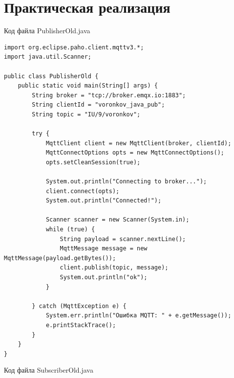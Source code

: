 \documentclass[a4paper, 14pt]{extarticle}
\begin{document}
\section{Практическая реализация}
Код файла PublisherOld.java
\begin{lstlisting}
import org.eclipse.paho.client.mqttv3.*;
import java.util.Scanner;

public class PublisherOld {
    public static void main(String[] args) {
        String broker = "tcp://broker.emqx.io:1883";
        String clientId = "voronkov_java_pub";
        String topic = "IU/9/voronkov";

        try {
            MqttClient client = new MqttClient(broker, clientId);
            MqttConnectOptions opts = new MqttConnectOptions();
            opts.setCleanSession(true);

            System.out.println("Connecting to broker...");
            client.connect(opts);
            System.out.println("Connected!");

            Scanner scanner = new Scanner(System.in);
            while (true) {
                String payload = scanner.nextLine();
                MqttMessage message = new MqttMessage(payload.getBytes());
                client.publish(topic, message);
                System.out.println("ok");
            }

        } catch (MqttException e) {
            System.err.println("Ошибка MQTT: " + e.getMessage());
            e.printStackTrace();
        }
    }
}
\end{lstlisting}
\per
Код файла SubscriberOld.java
\end{document}
